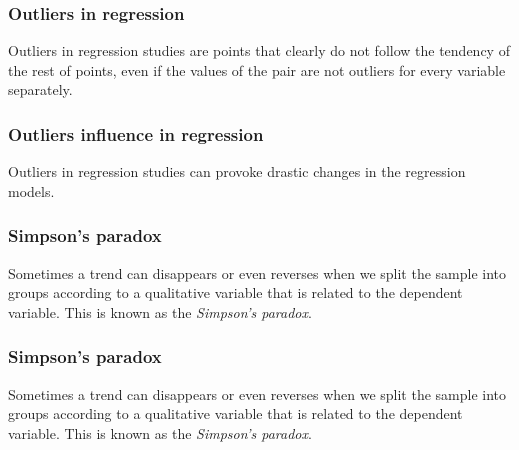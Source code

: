 \begin{frame}
\frametitle{Outliers in regression}
Outliers in regression studies are points that clearly do not follow the tendency of the rest of points, even if the values of the pair are not outliers for every variable separately.
\begin{center}
\resizebox{0.7\textwidth}{!}{}
\end{center}
\end{frame}


\begin{frame}
\frametitle{Outliers influence in regression}
Outliers in regression studies can provoke drastic changes in the regression models. 
\begin{center}
\resizebox{0.49\textwidth}{!}{}
\resizebox{0.49\textwidth}{!}{}
\end{center}
\end{frame}


\begin{frame}
\frametitle{Simpson's paradox}
Sometimes a trend can disappears or even reverses when we split the sample into groups according to a qualitative variable that is related to the dependent variable.
This is known as the \emph{Simpson's paradox}. 
\begin{center}
\resizebox{0.7\textwidth}{!}{}
\end{center}
\end{frame}



\begin{frame}
\frametitle{Simpson's paradox}
Sometimes a trend can disappears or even reverses when we split the sample into groups according to a qualitative variable that is related to the dependent variable.
This is known as the \emph{Simpson's paradox}. 
\begin{center}
\resizebox{0.7\textwidth}{!}{}
\end{center}
\end{frame}


